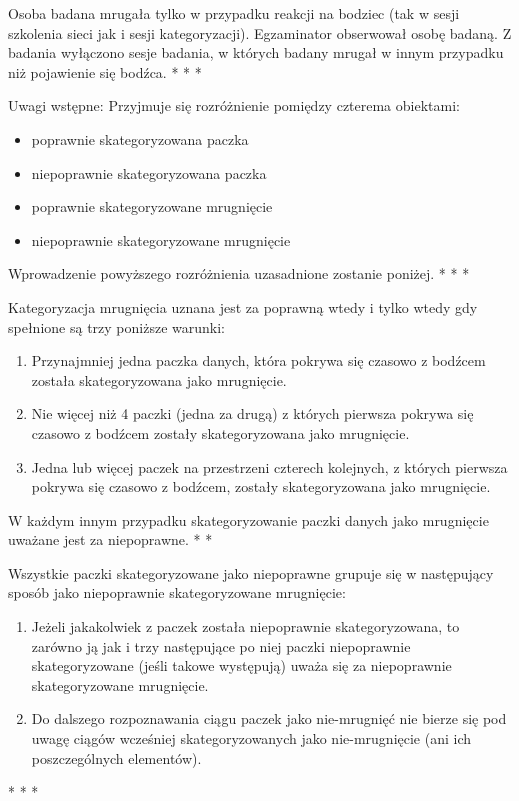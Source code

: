 \documentclass{article}
\begin{document}
    Osoba badana mrugała tylko w przypadku reakcji na bodziec (tak w sesji szkolenia sieci jak i sesji kategoryzacji).
    Egzaminator obserwował osobę badaną. Z badania wyłączono sesje badania, w których badany mrugał w innym przypadku niż pojawienie się bodźca.
    \newline
    * * *

    Uwagi wstępne: 
    Przyjmuje się rozróżnienie pomiędzy czterema obiektami:
    \begin{itemize}
        \item poprawnie skategoryzowana paczka
        \item niepoprawnie skategoryzowana paczka
        \item poprawnie skategoryzowane mrugnięcie
        \item niepoprawnie skategoryzowane mrugnięcie
    \end{itemize}
    Wprowadzenie powyższego rozróżnienia uzasadnione zostanie poniżej.
    \newline
    * * *

    Kategoryzacja mrugnięcia uznana jest za poprawną wtedy i tylko wtedy gdy spełnione są trzy poniższe warunki:
    \begin{enumerate}
        \item Przynajmniej jedna paczka danych, która pokrywa się czasowo z bodźcem została skategoryzowana jako mrugnięcie.
        \item Nie więcej niż 4 paczki (jedna za drugą) z których pierwsza pokrywa się czasowo z bodźcem zostały skategoryzowana jako mrugnięcie.
        \item Jedna lub więcej paczek na przestrzeni czterech kolejnych, z których pierwsza pokrywa się czasowo z bodźcem, zostały skategoryzowana jako mrugnięcie.
    \end{enumerate}
    W każdym innym przypadku skategoryzowanie paczki danych jako mrugnięcie uważane jest za niepoprawne.
    \newline
    * *
   
    Wszystkie paczki skategoryzowane jako niepoprawne grupuje się w następujący sposób jako niepoprawnie skategoryzowane mrugnięcie:
    \begin{enumerate}
        \item Jeżeli jakakolwiek z paczek została niepoprawnie skategoryzowana, to zarówno ją jak i trzy następujące po niej paczki niepoprawnie skategoryzowane (jeśli takowe występują) uważa się za niepoprawnie skategoryzowane mrugnięcie.
        \item Do dalszego rozpoznawania ciągu paczek jako nie-mrugnięć nie bierze się pod uwagę ciągów wcześniej skategoryzowanych jako nie-mrugnięcie (ani ich poszczególnych elementów).
    \end{enumerate}
    * * *
    
\end{document}
